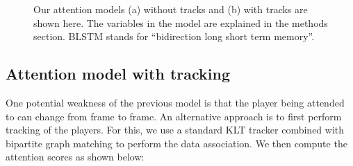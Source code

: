 \begin{figure}[t!]
\begin{center}

\end{center}
   \caption{Our attention models (a) without tracks and (b) with tracks are
   shown here. The variables in the model are explained in the methods
 section.
BLSTM stands for ``bidirection long short term memory''.
}
\label{fig:model}
\end{figure}


\subsection{Attention model with tracking}

One potential weakness of the previous model is that the
player being attended to can change from frame to frame.
An alternative approach is to first perform tracking of the
players. For this, we use a standard KLT tracker combined with
bipartite graph matching to perform the data association.
We then compute the attention scores as shown below:

